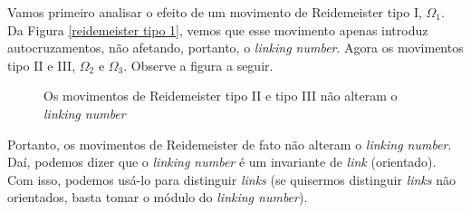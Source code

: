 	\par\vspace{0.3cm} Vamos primeiro analisar o efeito de um movimento de Reidemeister tipo I, $\Omega_1$. 
	Da Figura \ref{reidemeister tipo 1}, vemos que esse movimento apenas introduz autocruzamentos, não 
	afetando, portanto, o \textit{linking number}. Agora os movimentos tipo II e III, $\Omega_2$ e $\Omega_3$.
	Observe a figura a seguir.
	\begin{figure}[H]
        \centering
        \hfill
        \caption{Os movimentos de Reidemeister tipo II e tipo III não alteram o \textit{linking number}}
    \end{figure}
	Portanto, os movimentos de Reidemeister de fato não alteram o \textit{linking number}. 
	Daí, podemos dizer que o \textit{linking number} é um invariante de \textit{link} (orientado). Com isso,
	podemos usá-lo para distinguir \textit{links} (se quisermos distinguir \textit{links} não orientados, 
	basta tomar o módulo do \textit{linking number}).
	

